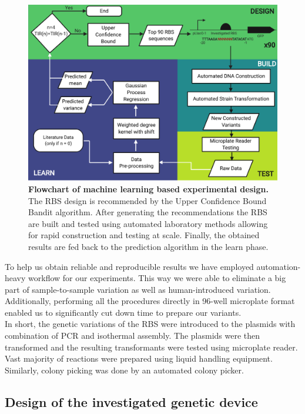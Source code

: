 \documentclass{article}
\begin{document}
\begin{figure}[h]
    \centering
    \includegraphics[scale=0.7]{plots/Main_Paper/flowchart.pdf}
    \caption{\textbf{Flowchart of machine learning based experimental design.} The RBS design is recommended by the Upper Confidence Bound Bandit algorithm. After generating the recommendations the RBS are built and tested using automated laboratory methods allowing for rapid construction and testing at scale. Finally, the obtained results are fed back to the prediction algorithm in the learn phase. }
    \label{fig: Flowchart}
\end{figure}

To help us obtain reliable and reproducible results we have employed automation-heavy workflow for our experiments.
This way we were able to eliminate a big part of sample-to-sample variation as well as human-introduced variation.
Additionally, performing all the procedures directly in 96-well microplate format enabled us to significantly cut down time to prepare our variants.\\
In short, the genetic variations of the RBS were introduced to the plasmids with combination of PCR and isothermal assembly. 
The plasmids were then transformed and the resulting transformants were tested using microplate reader.
Vast majority of reactions were prepared using liquid handling equipment.
Similarly, colony picking was done by an automated colony picker.\\

\subsection{Design of the investigated genetic device}
\end{document}
